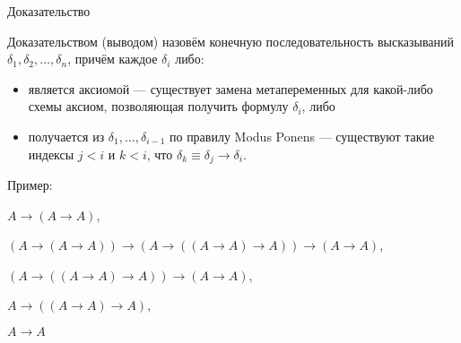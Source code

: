 \documentclass[handout]{beamer}
\begin{document}
\begin{frame}{Доказательство}
\begin{defrus}
Доказательством (выводом) назовём конечную последовательность высказываний $\delta_1, \delta_2, \dots, \delta_n$, \pause
причём каждое $\delta_i$ либо:
\begin{itemize}
\item является аксиомой --- существует замена метапеременных для какой-либо схемы аксиом, позволяющая получить
формулу $\delta_i$, либо\pause
\item получается из $\delta_1,\dots,\delta_{i-1}$ по правилу Modus Ponens --- существуют такие индексы $j < i$ и $k < i$,
что $\delta_k \equiv \delta_j\rightarrow\delta_i$.
\end{itemize}\end{defrus}\pause

Пример:\vspace{0.3cm}

$A \rightarrow (A \rightarrow A)$,

$(A \rightarrow (A \rightarrow A)) \rightarrow 
  (A \rightarrow ((A \rightarrow A) \rightarrow A)) \rightarrow
  (A \rightarrow A)$,

$(A \rightarrow ((A \rightarrow A) \rightarrow A)) \rightarrow
  (A \rightarrow A)$,

$A \rightarrow ((A \rightarrow A) \rightarrow A)$,

$A \rightarrow A$\end{frame}
\end{document}
